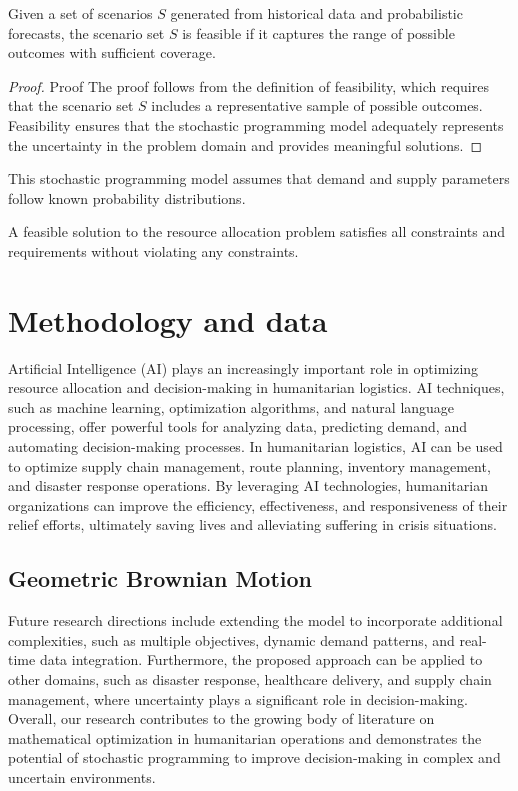 \documentclass[deca,sglanonrev]{informs4}
\begin{document}
\begin{lemma}\label{lem:FSS}
Given a set of scenarios $S$ generated from historical data and probabilistic forecasts, the scenario set $S$ is feasible if it captures the range of possible outcomes with sufficient coverage.
\end{lemma}

\begin{proof}{Proof}
The proof follows from the definition of feasibility, which requires that the scenario set $S$ includes a representative sample of possible outcomes. Feasibility ensures that the stochastic programming model adequately represents the uncertainty in the problem domain and provides meaningful solutions.\Halmos
\end{proof}

\begin{remark}
This stochastic programming model assumes that demand and supply parameters follow known probability distributions.
\end{remark}

\begin{definition}
A feasible solution to the resource allocation problem satisfies all constraints and requirements without violating any constraints.
\end{definition}

\section{Methodology and data}\label{sec:Method}
Artificial Intelligence (AI) plays an increasingly important role in optimizing resource allocation and decision-making in humanitarian logistics. AI techniques, such as machine learning, optimization algorithms, and natural language processing, offer powerful tools for analyzing data, predicting demand, and automating decision-making processes. In humanitarian logistics, AI can be used to optimize supply chain management, route planning, inventory management, and disaster response operations. By leveraging AI technologies, humanitarian organizations can improve the efficiency, effectiveness, and responsiveness of their relief efforts, ultimately saving lives and alleviating suffering in crisis situations.

\subsection{Geometric Brownian Motion}\label{sec:MGB}
Future research directions include extending the model to incorporate additional complexities, such as multiple objectives, dynamic demand patterns, and real-time data integration. Furthermore, the proposed approach can be applied to other domains, such as disaster response, healthcare delivery, and supply chain management, where uncertainty plays a significant role in decision-making. Overall, our research contributes to the growing body of literature on mathematical optimization in humanitarian operations and demonstrates the potential of stochastic programming to improve decision-making in complex and uncertain environments.
\end{document}
